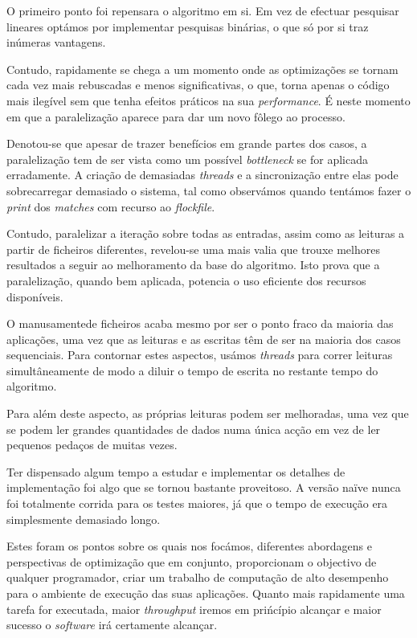 \documentclass[a4paper]{article}
\begin{document}
O primeiro ponto foi repensara o algoritmo em si. Em vez de efectuar pesquisar lineares optámos por implementar pesquisas binárias, o que só por si traz inúmeras vantagens.

Contudo, rapidamente se chega a um momento onde as optimizações se tornam cada vez mais rebuscadas e menos significativas, o que, torna apenas o código mais ilegível sem que tenha efeitos práticos na sua \textit{performance}. É neste momento em que a paralelização aparece para dar um novo fôlego ao processo.

Denotou-se que apesar de trazer benefícios em grande partes dos casos, a paralelização tem de ser vista como um possível \textit{bottleneck} se for aplicada erradamente. A criação de demasiadas \textit{threads} e a sincronização entre elas pode sobrecarregar demasiado o sistema, tal como observámos quando tentámos fazer o \textit{print} dos \textit{matches} com recurso ao \textit{flockfile}.

Contudo, paralelizar a iteração sobre todas as entradas, assim como as leituras a partir de ficheiros diferentes, revelou-se uma mais valia que trouxe melhores resultados a seguir ao melhoramento da base do algoritmo. Isto prova que a paralelização, quando bem aplicada, potencia o uso eficiente dos recursos disponíveis.

O manusamentede ficheiros acaba mesmo por ser o ponto fraco da maioria das aplicações, uma vez que as leituras e as escritas têm de ser na maioria dos casos sequenciais. Para contornar estes aspectos, usámos \textit{threads} para correr leituras simultâneamente de modo a diluir o tempo de escrita no restante tempo do algoritmo.

Para além deste aspecto, as próprias leituras podem ser melhoradas, uma vez que se podem ler grandes quantidades de dados numa única acção em vez de ler pequenos pedaços de muitas vezes.

Ter dispensado algum tempo a estudar e implementar os detalhes de implementação foi algo que se tornou bastante proveitoso. A versão naïve nunca foi totalmente corrida para os testes maiores, já que o tempo de execução era simplesmente demasiado longo.

Estes foram os pontos sobre os quais nos focámos, diferentes abordagens e perspectivas de optimização que em conjunto, proporcionam o objectivo de qualquer programador, criar um trabalho de computação de alto desempenho para o ambiente de execução das suas aplicações. Quanto mais rapidamente uma tarefa for executada, maior \textit{throughput} iremos em prińcípio alcançar e maior sucesso o \textit{software} irá certamente alcançar.
\clearpage
\end{document}

